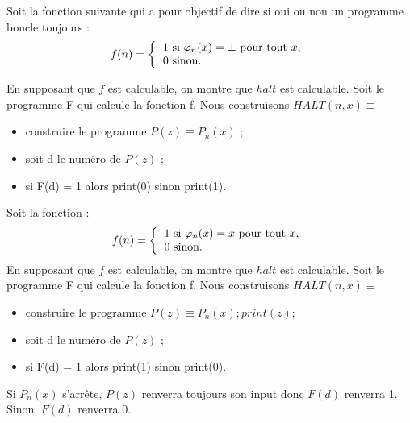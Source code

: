 \begin{myexem}
Soit la fonction suivante qui a pour objectif de dire si oui ou non un programme boucle toujours :
\begin{equation*}
f(n) =\left\{\begin{tabular}{l}
		$1$ si $\varphi_n(x)=\bot$ pour tout $x$,\\
        $0$ sinon.
	\end{tabular}\right.
\end{equation*}

En supposant que $f$ est calculable, on montre que $halt$ est calculable. Soit le programme F qui calcule la fonction f. Nous construisons $ HALT(n,x) \equiv $
		\begin{itemize}
		\item construire le programme $P(z) \equiv P_{n}(x)$ ;
		\item soit d le numéro de $P(z)$ ;
		\item si F(d) = 1 alors print(0) sinon print(1).
		\end{itemize}
\end{myexem}

\begin{myexem}
Soit la fonction :
\begin{equation*}
f(n) =\left\{\begin{tabular}{l}
		$1$ si $\varphi_n(x)=x$ pour tout $x$,\\
        $0$ sinon.
	\end{tabular}\right.
\end{equation*}
En supposant que $f$ est calculable, on montre que $halt$ est calculable. Soit le programme F qui calcule la fonction f. Nous construisons $ HALT(n,x) \equiv $
		\begin{itemize}
		\item construire le programme $P(z) \equiv P_{n}(x); print(z);$
		\item soit d le numéro de $P(z)$ ;
		\item si F(d) = 1 alors print(1) sinon print(0).
		\end{itemize}

Si $P_n(x)$ s'arrête, $P(z)$ renverra toujours son input donc $F(d)$ renverra 1. Sinon, $F(d)$ renverra 0. 
\end{myexem}

